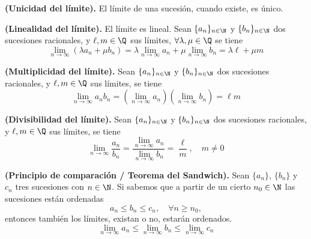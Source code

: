 \begin{proposition}
    \textbf{(Unicidad del límite).} El límite de una sucesión, cuando existe, es único.
\end{proposition}
\begin{proposition}
    \textbf{(Linealidad del límite).} El límite es lineal. Sean $\{a_n\}_{n\in\N} $ y $\{b_n\}_{n\in\N} $ dos sucesiones racionales, y $\ell, m\in\Q$ sus límites, $\forall\lambda, \mu\in\Q$ se tiene
    \begin{equation}
        \lim_{n\to\infty}\left( \lambda a_n + \mu b_n \right) = \lambda \lim_{n\to\infty}a_n + \mu\lim_{n\to\infty}b_n = \lambda\ell + \mu m
    \end{equation}
\end{proposition}
\begin{proposition}
    \textbf{(Multiplicidad del límite).} Sean $\{a_n\}_{n\in\N} $ y $\{b_n\}_{n\in\N} $ dos sucesiones racionales, y $\ell, m\in\Q$ sus límites, se tiene
    \begin{equation}
        \lim_{n\to\infty}a_nb_n = \left( \lim_{n\to\infty} a_n\right) \left( \lim_{n\to\infty}b_n \right) = \ell m
    \end{equation}
\end{proposition}
\begin{proposition}
    \textbf{(Divisibilidad del límite).} Sean $\{a_n\}_{n\in\N} $ y $\{b_n\}_{n\in\N} $ dos sucesiones racionales, y $\ell, m\in\Q$ sus límites, se tiene
    \begin{equation}
        \lim_{n\to\infty} \frac{a_n}{b_n} = \frac{\lim_{n\to\infty} a_n}{\lim_{n\to\infty}b_n} = \frac{\ell}{m},\quad m\neq 0
    \end{equation}
\end{proposition}

\begin{theorem}
    \textbf{(Principio de comparación / Teorema del Sandwich).} Sean $\{a_n\} $, $\{b_n\} $ y $c_n$ tres sucesiones con $n\in\N$. Si sabemos que a partir de un cierto $n_0\in\N$ las sucesiones están ordenadas
    \begin{equation}
        a_n\leq b_n\leq c_n,\quad\forall n\geq n_0,
    \end{equation}
    entonces también los límites, existan o no, estarán ordenados.
    \begin{equation}
        \lim_{n\to\infty}a_n \leq \lim_{n\to\infty} b_n \leq \lim_{n\to\infty} c_n
    \end{equation}
\end{theorem}

